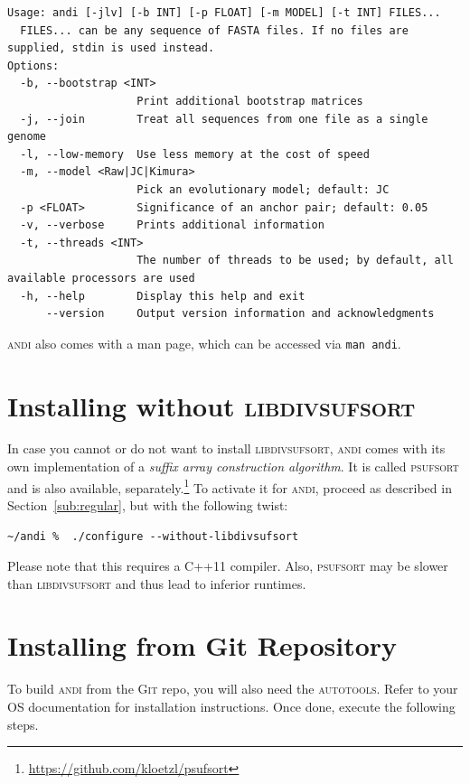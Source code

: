 \documentclass[a4paper,
  10pt,
  english,
  DIV=12,
  BCOR=8mm]{scrbook}
\newcommand{\algo}[1]{\textsc{{#1}}}
\newcommand{\andi}{\algo{andi}\xspace}
\begin{document}
\begin{lstlisting}
Usage: andi [-jlv] [-b INT] [-p FLOAT] [-m MODEL] [-t INT] FILES...
  FILES... can be any sequence of FASTA files. If no files are supplied, stdin is used instead.
Options:
  -b, --bootstrap <INT>
                    Print additional bootstrap matrices
  -j, --join        Treat all sequences from one file as a single genome
  -l, --low-memory  Use less memory at the cost of speed
  -m, --model <Raw|JC|Kimura>
                    Pick an evolutionary model; default: JC
  -p <FLOAT>        Significance of an anchor pair; default: 0.05
  -v, --verbose     Prints additional information
  -t, --threads <INT>
                    The number of threads to be used; by default, all available processors are used
  -h, --help        Display this help and exit
      --version     Output version information and acknowledgments
\end{lstlisting}

\noindent \andi also comes with a man page, which can be accessed via \lstinline$man andi$. %

\section{Installing without \algo{libdivsufsort}} \label{sub:wo-divsufsort}

In case you cannot or do not want to install \algo{libdivsufsort}, \andi comes with its own implementation of a \emph{suffix array construction algorithm}. It is called \algo{psufsort} and is also available, separately.\footnote{\url{https://github.com/kloetzl/psufsort}} To activate it for \algo{andi}, proceed as described in Section~\ref{sub:regular}, but with the following twist:

\begin{lstlisting}
~/andi %  ./configure --without-libdivsufsort
\end{lstlisting}

Please note that this requires a C++11 compiler. Also, \algo{psufsort} may be slower than \algo{libdivsufsort} and thus lead to inferior runtimes.

\section{Installing from Git Repository}

To build \andi from the \algo{Git} repo, you will also need the \algo{autotools}. Refer to your OS documentation for installation instructions. Once done, execute the following steps.
\end{document}
